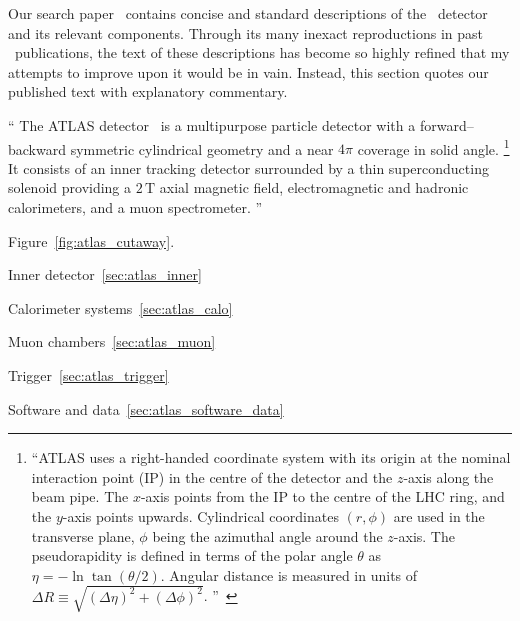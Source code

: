 
Our search paper~\cite{atlas2022searches} contains concise and standard
descriptions of the \atlas\ detector and its relevant components.
Through its many inexact reproductions in past \atlas\ publications, the text
of these descriptions has become so highly refined that my attempts to improve
upon it would be in vain.
Instead, this section quotes our published text with explanatory commentary.

\begin{displayquote}
``%
The ATLAS detector~\cite{PERF-2007-01} is a multipurpose particle detector with
a forward--backward symmetric cylindrical geometry and a near $4\pi$ coverage
in solid angle.%
\footnote{%
``ATLAS uses a right-handed coordinate system with its origin at the nominal
interaction point (IP) in the centre of the detector and the $z$-axis along the
beam pipe.
The $x$-axis points from the IP to the centre of the LHC ring, and the $y$-axis
points upwards.
Cylindrical coordinates $(r,\phi)$ are used in the transverse plane, $\phi$
being the azimuthal angle around the $z$-axis.
The pseudorapidity is defined in terms of the polar angle $\theta$ as
$\eta = -\ln \tan(\theta/2)$.
Angular distance is measured in units of
$\Delta R \equiv \sqrt{(\Delta\eta)^{2} + (\Delta\phi)^{2}}$.%
''~\cite{atlas2022searches}
}
It consists of an inner tracking detector surrounded by a thin superconducting
solenoid providing a $2\,\mathrm{T}$ axial magnetic field, electromagnetic and
hadronic calorimeters, and a muon spectrometer.%
''~\cite{atlas2022searches}
\end{displayquote}

Figure~\ref{fig:atlas_cutaway}.

Inner detector~\ref{sec:atlas_inner}

Calorimeter systems~\ref{sec:atlas_calo}

Muon chambers~\ref{sec:atlas_muon}

Trigger~\ref{sec:atlas_trigger}

Software and data~\ref{sec:atlas_software_data}


